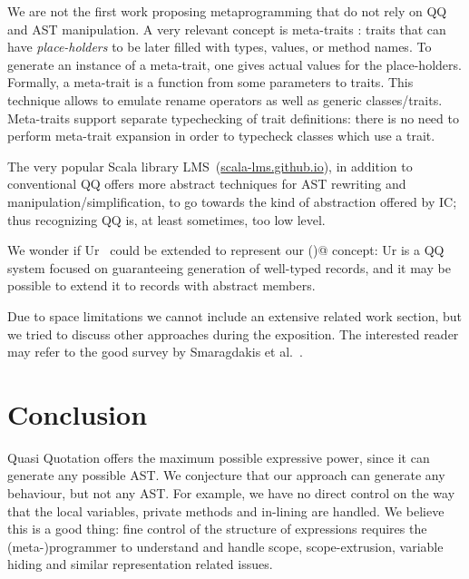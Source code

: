 We are not the first work proposing metaprogramming that do not rely on QQ and AST manipulation.
A very relevant concept is meta-traits \cite{reppy2007metaprogramming}:
 traits that can have \emph{place-holders} to be later filled with types, 
values, or method names.
To generate an instance of a meta-trait, one 
gives actual values for the place-holders. 
Formally, a meta-trait is a function from some parameters to traits.
This technique allows to emulate rename operators as well as generic classes/traits.
Meta-traits support separate typechecking of trait definitions:  there is no need to perform meta-trait expansion
 in order to typecheck classes which use a trait.

The very popular Scala library LMS~(\url{scala-lms.github.io}), in addition to conventional QQ offers
more abstract techniques for AST rewriting and manipulation/simplification,
to go towards the kind of abstraction offered by IC;
thus recognizing QQ is, at least sometimes, too low level.

We wonder if Ur~\cite{chlipala2010ur} could be extended to represent our \Q@inductive()@ concept:
Ur is a QQ system focused on guaranteeing generation of well-typed records,
and it may be possible to extend it to records with abstract members.

Due to space limitations we cannot include an extensive related work section,
but we tried to discuss other approaches during the exposition.
The interested reader may refer to the good survey by Smaragdakis et al.~\cite{smaragdakis2015structured}.

\section{Conclusion}


Quasi Quotation offers the maximum possible expressive power, since it can generate any possible AST.
We conjecture that our approach can generate any behaviour, but not any AST.
For example, we have no direct control on the way that the local variables, private methods 
and in-lining are handled.
We believe this is a good thing: fine control of the structure of expressions requires
the (meta-)programmer to understand and handle scope, scope-extrusion, variable hiding and similar
representation related issues.


